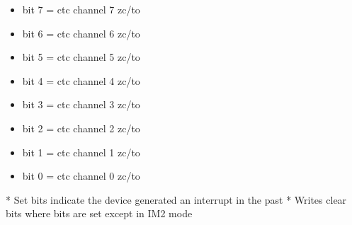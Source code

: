\begin{itemize}
\item bit 7 = ctc channel 7 zc/to
\item bit 6 = ctc channel 6 zc/to
\item bit 5 = ctc channel 5 zc/to
\item bit 4 = ctc channel 4 zc/to
\item bit 3 = ctc channel 3 zc/to
\item bit 2 = ctc channel 2 zc/to
\item bit 1 = ctc channel 1 zc/to
\item bit 0 = ctc channel 0 zc/to
\end{itemize}
* Set bits indicate the device generated an interrupt in the past
* Writes clear bits where bits are set except in IM2 mode

